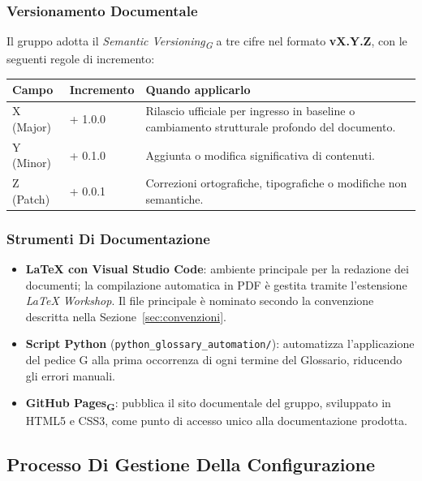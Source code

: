 \subsubsection{Versionamento Documentale}
 
Il gruppo adotta il \textit{Semantic Versioning\textsubscript{G}} a tre cifre nel
formato \textbf{vX.Y.Z}, con le seguenti regole di incremento:
 
\bigskip
\begin{tabularx}{\textwidth}{l l X}
  \toprule
  \textbf{Campo} & \textbf{Incremento} & \textbf{Quando applicarlo} \\
  \midrule
  X (Major) & + 1.0.0 & Rilascio ufficiale per ingresso in baseline o cambiamento
                        strutturale profondo del documento. \\[4pt]
  Y (Minor) & + 0.1.0 & Aggiunta o modifica significativa di contenuti. \\[4pt]
  Z (Patch) & + 0.0.1 & Correzioni ortografiche, tipografiche o modifiche
                        non semantiche. \\
  \bottomrule
\end{tabularx}
 
\subsubsection{Strumenti Di Documentazione}
\label{sec:strumenti-doc}
 
\begin{itemize}
  \item \textbf{\LaTeX{} con Visual Studio Code}: ambiente principale per la
        redazione dei documenti; la compilazione automatica in PDF è gestita
        tramite l'estensione \textit{LaTeX Workshop}. Il file principale è
        nominato secondo la convenzione descritta nella
        Sezione~\ref{sec:convenzioni}.
  \item \textbf{Script Python} (\texttt{python\_glossary\_automation/}):
        automatizza l'applicazione del pedice G alla prima
        occorrenza di ogni termine del Glossario, riducendo gli errori manuali.
  \item \textbf{GitHub Pages\textsubscript{G}}: pubblica il sito documentale del
        gruppo, sviluppato in HTML5 e CSS3, come punto di accesso unico alla
        documentazione prodotta.
\end{itemize}
 
\subsection{Processo Di Gestione Della Configurazione}
\label{sec:configurazione}
 
